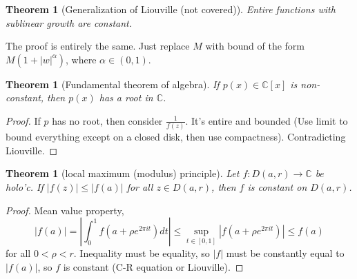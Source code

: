 \documentclass{article}
\theoremstyle{definition}
\theoremstyle{remark}
\theoremstyle{plain}
\newtheorem{thm}[defn]{Theorem}
\newcommand{\CC}{\mathbb{C}}
\begin{document}
\begin{thm}[Generalization of Liouville (not covered)]
    Entire functions with sublinear growth are constant.
\end{thm}
The proof is entirely the same. Just replace $M$ with bound of the form $M(1+|w|^\alpha)$, where $\alpha\in(0,1)$.
\begin{thm}[Fundamental theorem of algebra]
    If $p(x)\in\CC[x]$ is non-constant, then $p(x)$ has a root in $\CC$.
\end{thm}
\begin{proof}
    If $p$ has no root, then consider $\frac{1}{f(z)}$. It's entire and bounded (Use limit to bound everything except on a closed disk, then use compactness). Contradicting Liouville.
\end{proof}
\begin{thm}[local maximum (modulus) principle]
    Let $f:D(a,r)\to\CC$ be holo'c. If $|f(z)|\le |f(a)|$ for all $z\in D(a,r)$, then $f$ is constant on $D(a,r)$.
\end{thm}
\begin{proof}
Mean value property,
    \[|f(a)|=\left|\int_0^1 f(a+\rho e^{2\pi it})dt\right|\le \sup_{t\in[0,1]}|f(a+\rho e^{2\pi it})|\le f(a)\]
    for all $0<\rho<r$. Inequality must be equality, so $|f|$ must be constantly equal to $|f(a)|$, so $f$ is constant (C-R equation or Liouville).
\end{proof}
\end{document}
